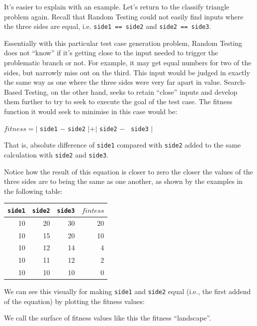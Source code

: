 It's easier to explain with an example. Let's return to the classify triangle
problem again. Recall that Random Testing could not easily find inputs where the
three sides are equal, i.e. {\tt side1 == side2} and {\tt side2 == side3}.

Essentially with this particular test case generation problem, Random Testing
does not ``know'' if it's getting close to the input needed to trigger the
problematic branch or not. For example, it may get equal numbers for two of the
sides, but narrowly miss out on the third. This input would be judged in exactly
the same way as one where the three sides were very far apart in value.
Search-Based Testing, on the other hand, seeks to retain ``close'' inputs and
develop them further to try to seek to execute the goal of the test case. The
fitness function it would seek to minimise in this case would be:

\begin{center}
$\mathit{fitness} = |$ {\tt side1} $-$ {\tt side2} $| + |$ {\tt side2} $-$ {\tt
side3} $|$
\end{center}

That is, absolute difference of {\tt side1} compared with {\tt side2} added to
the same calculation with {\tt side2} and {\tt side3}.

Notice how the result of this equation is closer to zero the closer the values
of the three sides are to being the same as one another, as shown by the
examples in the following table:

\begin{center}
    \begin{tabular}{rrrr}
        \toprule 
        {\tt side1} & {\tt side2} & {\tt side3} & $\mathit{fintess}$ \\
        \midrule
        10 & 20 & 30 & 20 \\
        10 & 15 & 20 & 10 \\
        10 & 12 & 14 & 4  \\
        10 & 11 & 12 & 2  \\
        10 & 10 & 10 & 0  \\
        \bottomrule
    \end{tabular}
\end{center}

We can see this visually for making {\tt side1} and {\tt side2} equal (i.e., the
first addend of the equation) by plotting the fitness values:

We call the surface of fitness values like this the fitness ``landscape''. 

